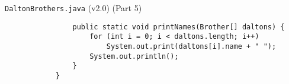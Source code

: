 \documentclass[10pt, compress]{beamer}
\begin{document}
\begin{slide}
	\begin{block}{\texttt{DaltonBrothers.java} (v2.0) (Part 5)}
		\begin{verbatim}
			    public static void printNames(Brother[] daltons) {
			        for (int i = 0; i < daltons.length; i++)
			            System.out.print(daltons[i].name + " ");
			        System.out.println();
			    }
			}
		\end{verbatim}
	\end{block}
\end{slide}

\end{document}
